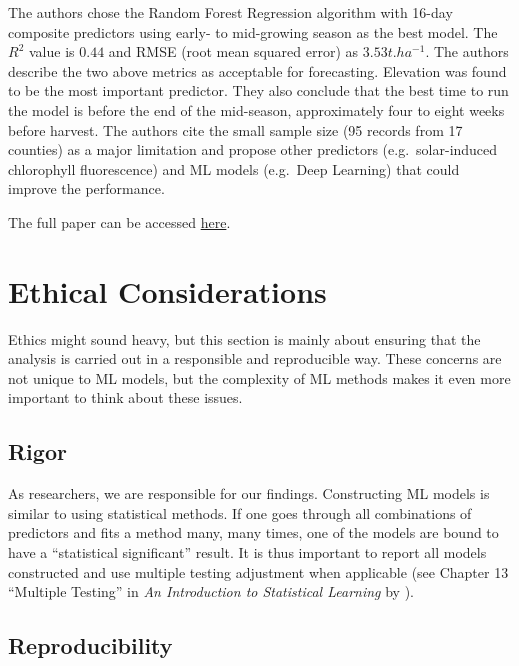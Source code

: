 \documentclass[
]{book}
\begin{document}
The authors chose the Random Forest Regression algorithm with 16-day composite predictors using early- to mid-growing season as the best model. The \(R^2\) value is \(0.44\) and RMSE (root mean squared error) as \(3.53 t.ha^{-1}\). The authors describe the two above metrics as acceptable for forecasting. Elevation was found to be the most important predictor. They also conclude that the best time to run the model is before the end of the mid-season, approximately four to eight weeks before harvest. The authors cite the small sample size (95 records from 17 counties) as a major limitation and propose other predictors (e.g.~solar-induced chlorophyll fluorescence) and ML models (e.g.~Deep Learning) that could improve the performance.

The full paper can be accessed \href{https://essopenarchive.org/users/716273/articles/870897-in-season-sweetpotato-yield-forecasting-using-multitemporal-remote-sensing-environmental-observations-and-machine-learning}{here}.

\hypertarget{ethical-considerations}{%
\chapter{Ethical Considerations}\label{ethical-considerations}}

Ethics might sound heavy, but this section is mainly about ensuring that the analysis is carried out in a responsible and reproducible way. These concerns are not unique to ML models, but the complexity of ML methods makes it even more important to think about these issues.

\hypertarget{rigor}{%
\section{Rigor}\label{rigor}}

As researchers, we are responsible for our findings. Constructing ML models is similar to using statistical methods. If one goes through all combinations of predictors and fits a method many, many times, one of the models are bound to have a ``statistical significant'' result. It is thus important to report all models constructed and use multiple testing adjustment when applicable (see Chapter 13 ``Multiple Testing'' in \emph{An Introduction to Statistical Learning} by \citet{james2013introduction}).

\hypertarget{reproducibility}{%
\section{Reproducibility}\label{reproducibility}}
\end{document}
